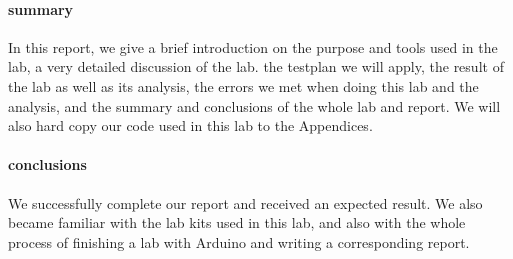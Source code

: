 \paragraph{summary} In this report, we give a brief introduction on the purpose and tools used in the lab, a very detailed discussion of the lab. the testplan we will apply, the result of the lab as well as its analysis, the errors we met when doing this lab and the analysis, and the summary and conclusions of the whole lab and report. We will also hard copy our code used in this lab to the Appendices.
\paragraph{conclusions} We successfully complete our report and received an expected result. We also became familiar with the lab kits used in this lab, and also with the whole process of finishing a lab with Arduino and writing a corresponding report.
